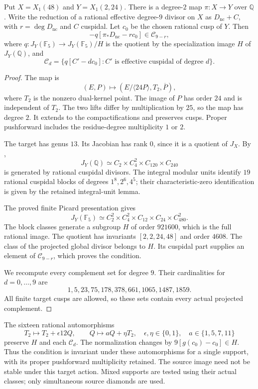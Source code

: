 \begin{lemma}\label{lem:nonic48-class-filter}
Put $X=X_1(48)$ and $Y=X_1(2,24)$. There is a degree-$2$ map
$\pi:X\to Y$ over $\mathbb Q$. Write the reduction of a rational
effective degree-$9$ divisor on $X$ as $D_{\mathrm{nc}}+C$, with
$r=\deg D_{\mathrm{nc}}$ and $C$ cuspidal. Let $c_0$ be the chosen
rational cusp of $Y$. Then
\[
 -q[\pi_*D_{\mathrm{nc}}-rc_0]\in\mathcal C_{9-r},
\]
where $q:J_Y(\mathbb F_5)\to J_Y(\mathbb F_5)/H$ is the quotient
by the specialization image $H$ of $J_Y(\mathbb Q)$, and
\[
 \mathcal C_d=\{q[C'-dc_0]: C'\text{ is effective cuspidal of degree }d\}.
\]
\end{lemma}
\begin{proof}
The map is
\[
 (E,P)\longmapsto
 (E/\langle24P\rangle,T_2,\overline P),
\]
where $T_2$ is the nonzero dual-kernel point. The image of $P$ has
order $24$ and is independent of $T_2$. The two lifts differ by
multiplication by $25$, so the map has degree $2$.
It extends to the compactifications and preserves cusps.
Proper pushforward includes the residue-degree multiplicity $1$ or $2$.

The target has genus $13$. Its Jacobian has rank $0$, since it is
a quotient of $J_X$. By \cite[Proposition~4.16 and Table~3]{DEHMZ},
\[
 J_Y(\mathbb Q)\simeq C_2\times C_4^2\times C_{120}\times C_{240}
\]
is generated by rational cuspidal divisors. The integral modular
units identify $19$ rational cuspidal blocks of degrees
$1^8,2^6,4^5$; their characteristic-zero identification is given by
the retained integral-unit lemma.

The proved finite Picard presentation gives
\[
 J_Y(\mathbb F_5)\simeq C_2^2\times C_4^2\times C_{12}
 \times C_{24}\times C_{480}^2.
\]
The block classes generate a subgroup $H$ of order $921600$,
which is the full rational image. The quotient has invariants
$[2,2,24,48]$ and order $4608$.
The class of the projected global divisor belongs to $H$.
Its cuspidal part supplies an element of $\mathcal C_{9-r}$,
which proves the condition.

We recompute every complement set for degree $9$. Their cardinalities
for $d=0,\ldots,9$ are
\[
 1,5,23,75,178,378,661,1065,1487,1859.
\]
All finite target cusps are allowed, so these sets contain every
actual projected complement.
\end{proof}

The sixteen rational automorphisms
\[
 T_2\longmapsto T_2+\epsilon12Q,\qquad
 Q\longmapsto aQ+\eta T_2,
 \quad \epsilon,\eta\in\{0,1\},\quad a\in\{1,5,7,11\}
\]
preserve $H$ and each $\mathcal C_d$. The normalization changes
by $9[g(c_0)-c_0]\in H$. Thus the condition is invariant under
these automorphisms for a single support, with its proper
pushforward multiplicity retained. The source image need not be
stable under this target action. Mixed supports are tested using
their actual classes; only simultaneous source diamonds are used.
